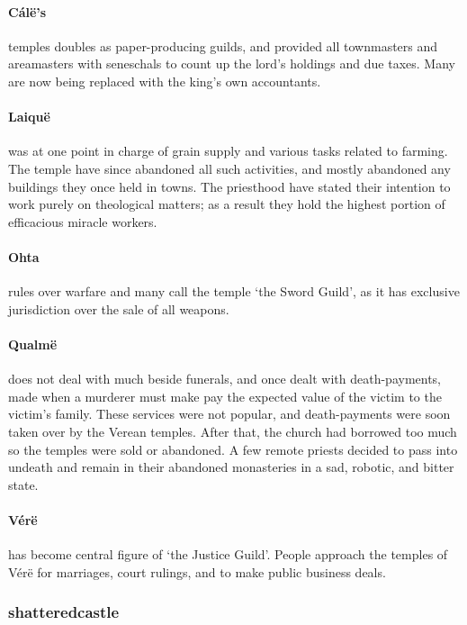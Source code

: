 \begin{multicols}{2}
\paragraph{C\'{a}l\"{e}'s} temples doubles as paper-producing guilds, and provided all townmasters and areamasters with seneschals to count up the lord's holdings and due taxes.
Many are now being replaced with the \gls{king}'s own accountants.

\paragraph{Laiqu\"{e}} was at one point in charge of grain supply and various tasks related to farming.
The temple have since abandoned all such activities, and mostly abandoned any buildings they once held in towns.
The priesthood have stated their intention to work purely on theological matters; as a result they hold the highest portion of efficacious miracle workers.

\paragraph{Ohta} rules over warfare and many call the temple `the Sword Guild', as it has exclusive jurisdiction over the sale of all weapons.

\paragraph{Qualm\"{e}} does not deal with much beside funerals, and once dealt with death-payments, made when a murderer must make pay the expected value of the victim to the victim's family.
These services were not popular, and death-payments were soon taken over by the Verean temples.
After that, the church had borrowed too much so the temples were sold or abandoned.
A few remote priests decided to pass into undeath and remain in their abandoned monasteries in a sad, robotic, and bitter state.

\paragraph{V\'{e}r\"{e}} has become central figure of `the Justice Guild'.
People approach the temples of V\'{e}r\"{e} for marriages, court rulings, and to make public business deals.

\subsubsection{\Gls{shatteredcastle}}


\end{multicols}

